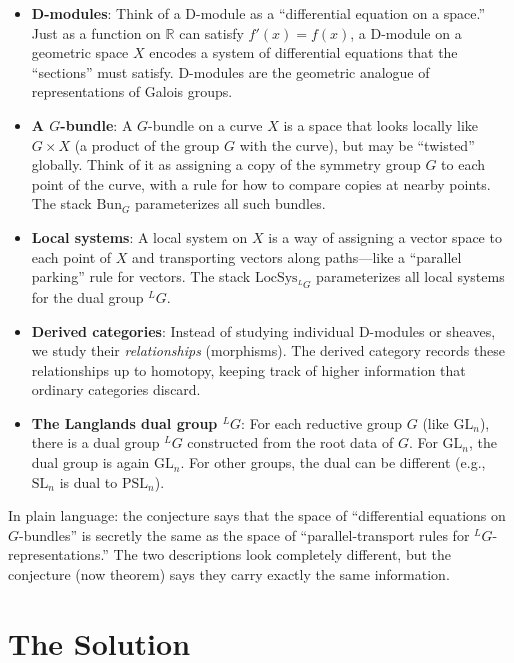 \begin{itemize}
\item \textbf{D-modules}: Think of a D-module as a ``differential equation on a space.'' Just as a function on $\mathbb{R}$ can satisfy $f'(x) = f(x)$, a D-module on a geometric space $X$ encodes a system of differential equations that the ``sections'' must satisfy. D-modules are the geometric analogue of representations of Galois groups.
\item \textbf{A $G$-bundle}: A $G$-bundle on a curve $X$ is a space that looks locally like $G \times X$ (a product of the group $G$ with the curve), but may be ``twisted'' globally. Think of it as assigning a copy of the symmetry group $G$ to each point of the curve, with a rule for how to compare copies at nearby points. The stack $\mathrm{Bun}_G$ parameterizes all such bundles.
\item \textbf{Local systems}: A local system on $X$ is a way of assigning a vector space to each point of $X$ and transporting vectors along paths---like a ``parallel parking'' rule for vectors. The stack $\mathrm{LocSys}_{^LG}$ parameterizes all local systems for the dual group ${}^LG$.
\item \textbf{Derived categories}: Instead of studying individual D-modules or sheaves, we study their \emph{relationships} (morphisms). The derived category records these relationships up to homotopy, keeping track of higher information that ordinary categories discard.
\item \textbf{The Langlands dual group ${}^LG$}: For each reductive group $G$ (like $\mathrm{GL}_n$), there is a dual group ${}^LG$ constructed from the root data of $G$. For $\mathrm{GL}_n$, the dual group is again $\mathrm{GL}_n$. For other groups, the dual can be different (e.g., $\mathrm{SL}_n$ is dual to $\mathrm{PSL}_n$).
\end{itemize}

In plain language: the conjecture says that the space of ``differential equations on $G$-bundles'' is secretly the same as the space of ``parallel-transport rules for ${}^LG$-representations.'' The two descriptions look completely different, but the conjecture (now theorem) says they carry exactly the same information.

\section{The Solution}

